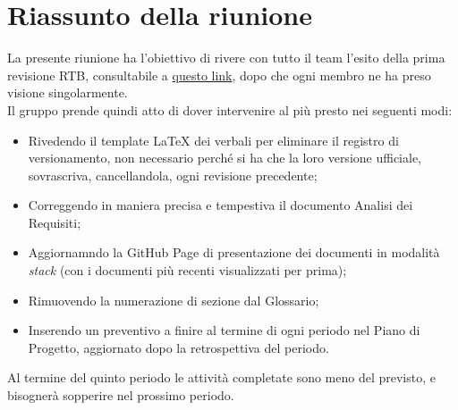 \section{Riassunto della riunione}
La presente riunione ha l'obiettivo di rivere con tutto il team l'esito della prima revisione RTB, consultabile a \href{https://www.math.unipd.it/~tullio/IS-1/2024/Progetto/RTB/PEBKAC.pdf}{questo link}, dopo che ogni membro ne ha preso visione singolarmente.
\\
Il gruppo prende quindi atto di dover intervenire al più presto nei seguenti modi:
\begin{itemize}
    \item Rivedendo il template LaTeX dei verbali per eliminare il registro di versionamento, non necessario perché si ha  che la
loro versione ufficiale, sovrascriva, cancellandola, ogni revisione
precedente;
\item Correggendo in maniera precisa e tempestiva il documento Analisi dei Requisiti;
    \item Aggiornamndo la GitHub Page di presentazione dei documenti in modalità \textit{stack} (con i documenti più recenti visualizzati per prima);
    \item Rimuovendo la numerazione di sezione dal Glossario;
    \item Inserendo un preventivo a finire al termine di ogni periodo nel Piano di Progetto, aggiornato dopo la retrospettiva del periodo.

\end{itemize}

Al termine del quinto periodo le attività completate sono meno del previsto, e bisognerà sopperire nel prossimo periodo. 

